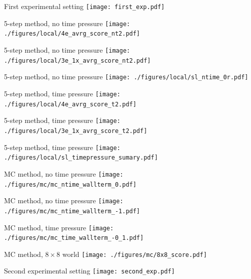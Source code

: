 \documentclass[hyperref={pdfpagelabels=false}]{beamer}
\begin{document}
\begin{frame}{First experimental setting}
\texttt{[image: first\_exp.pdf]}
\end{frame}

\begin{frame}{5-step method, no time pressure}
\texttt{[image: ./figures/local/4e\_avrg\_score\_nt2.pdf]}
\end{frame}

\begin{frame}{5-step method, no time pressure}
\texttt{[image: ./figures/local/3e\_1x\_avrg\_score\_nt2.pdf]}
\end{frame}

\begin{frame}{5-step method, no time pressure}
\texttt{[image: ./figures/local/sl\_ntime\_0r.pdf]}
\end{frame}

\begin{frame}{5-step method, time pressure}
\texttt{[image: ./figures/local/4e\_avrg\_score\_t2.pdf]}
\end{frame}

\begin{frame}{5-step method, time pressure}
\texttt{[image: ./figures/local/3e\_1x\_avrg\_score\_t2.pdf]}
\end{frame}

\begin{frame}{5-step method, time pressure}
\texttt{[image: ./figures/local/sl\_timepressure\_sumary.pdf]}
\end{frame}

\begin{frame}{MC method, no time pressure}
\texttt{[image: ./figures/mc/mc\_ntime\_wallterm\_0.pdf]}
\end{frame}

\begin{frame}{MC method, no time pressure}
\texttt{[image: ./figures/mc/mc\_ntime\_wallterm\_-1.pdf]}
\end{frame}

\begin{frame}{MC method, time pressure}
\texttt{[image: ./figures/mc/mc\_time\_wallterm\_-0\_1.pdf]}
\end{frame}

\begin{frame}{MC method, $8\times8$ world}
\texttt{[image: ./figures/mc/8x8\_score.pdf]}
\end{frame}

\begin{frame}{Second experimental setting}
\texttt{[image: second\_exp.pdf]}
\end{frame}
\end{document}
